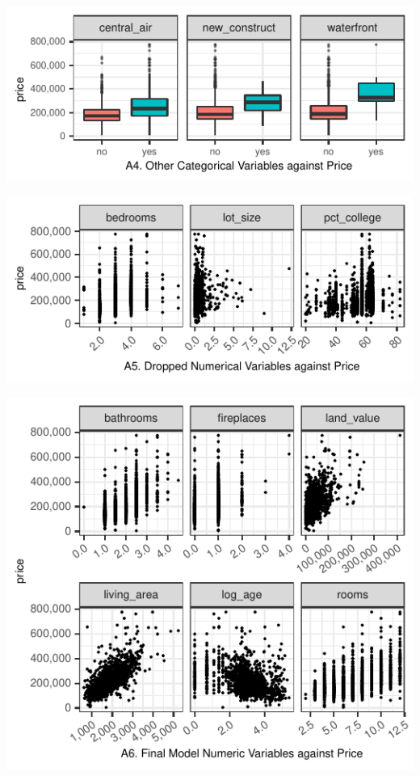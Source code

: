 \documentclass[letterpaper,9pt,twocolumn,twoside,]{pinp}
\begin{document}
\begin{center}\includegraphics{Report_files/figure-latex/unnamed-chunk-22-1} \end{center}

\vspace{-20pt}

\begin{center}\includegraphics{Report_files/figure-latex/unnamed-chunk-23-1} \end{center}

\begin{center}\includegraphics{Report_files/figure-latex/unnamed-chunk-24-1} \end{center}
\end{document}
